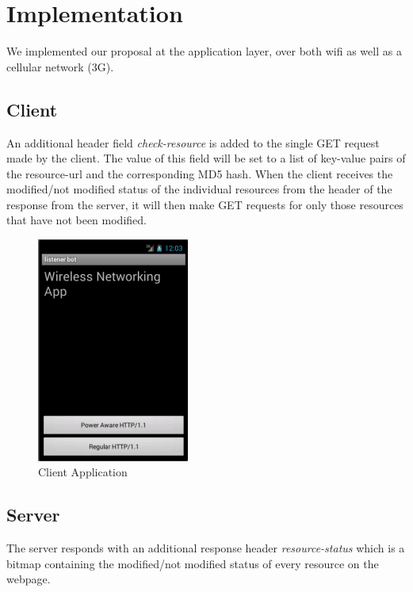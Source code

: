 \documentclass[9pt]{sigplan-proc-varsize}
\begin{document}
\bigskip

\section{Implementation}

We implemented our proposal at the application layer, over both wifi as well as a cellular network (3G).

\subsection{Client}

An additional header field {\it check-resource} is added to the single GET request made by the client. 
The value of this field will be set to a list of key-value pairs of the resource-url and the corresponding MD5 hash.  When the client receives the modified/not modified status of the individual resources from the header of the response from the server, it will then make GET requests for only those resources that have not been modified.

\begin{figure}[ht!]
\centering
\includegraphics[width=50mm]{app2}
\caption{Client Application }
\label{fig:sp_gd_mnist}
\end{figure}

\bigskip

\subsection{Server}

The server responds with an additional response header {\it resource-status} which is a bitmap containing the modified/not modified status of every resource on the webpage.

\bigskip
\end{document}
